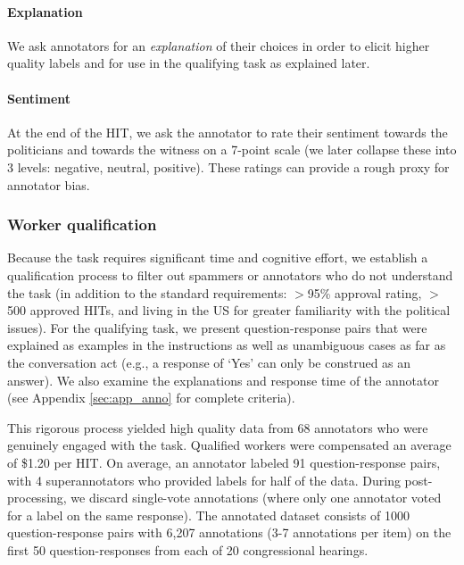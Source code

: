\paragraph{Explanation} We ask annotators for an \emph{explanation} of their choices in order to elicit higher quality labels \cite{McDonnell:2016} and for use in the qualifying task as explained later. 

\paragraph{Sentiment} At the end of the HIT, we ask the annotator to rate their sentiment towards the politicians and towards the witness on a 7-point scale (we later collapse these into 3 levels: negative, neutral, positive). These ratings can provide a rough proxy for annotator bias. 

\subsubsection{Worker qualification}
Because the task requires significant time and cognitive effort, we establish a qualification process to filter out spammers or annotators who do not understand the task (in addition to the standard requirements: $>$95\% approval rating, $>$500 approved HITs, and living in the US for greater familiarity with the political issues). For the qualifying task, we present question-response pairs that were explained as examples in the instructions as well as unambiguous cases as far as the conversation act (e.g., a response of `Yes' can only be construed as an answer). We also examine the explanations and response time of the annotator (see Appendix \ref{sec:app_anno} for complete criteria). 

This rigorous process yielded high quality data from 68 annotators who were genuinely engaged with the task. Qualified workers were compensated an average of \$1.20 per HIT. On average, an annotator labeled 91 question-response pairs, with 4 superannotators who provided labels for half of the data. During post-processing, we discard single-vote annotations (where only one annotator voted for a label on the same response). The annotated dataset consists of 1000 question-response pairs with 6,207 annotations (3-7 annotations per item) on the first 50 question-responses from each of 20 congressional hearings. 

